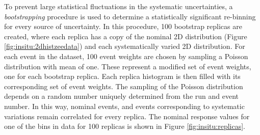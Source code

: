 To prevent large statistical fluctuations in the systematic uncertainties, a \textit{bootstrapping} procedure is used to determine a statistically significant re-binning for every source of uncertainty. In this procedure, 100 bootstrap replicas are created, where each replica has a copy of the nominal 2D distribution (Figure \ref{fig:insitu:2dhistzeedata}) and each systematically varied 2D distribution. For each event in the dataset, 100 event weights are chosen by sampling a Poisson distribution with mean of one. These represent a modified set of event weights, one for each bootstrap replica. Each replica histogram is then filled with its corresponding set of event weights. The sampling of the Poisson distribution depends on a random number uniquely determined from the run and event number. In this way, nominal events, and events corresponding to systematic variations remain correlated for every replica. The nominal \rdb response values for one of the \ptref bins in data for 100 replicas is shown in Figure \ref{fig:insitu:replicas}.

